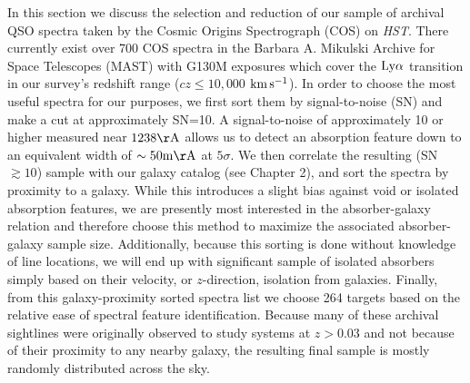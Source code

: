 \documentclass[twocolumn,tighten]{aastex62}
\newcommand{\kms}{$\rm km\, s^{-1}$}
\begin{document}
In this section we discuss the selection and reduction of our sample of archival QSO spectra taken by the Cosmic Origins Spectrograph (COS) on \textit{HST}. There currently exist over 700 COS spectra in the Barbara A. Mikulski Archive for Space Telescopes (MAST) with G130M exposures which cover the $\rm Ly\alpha$ transition in our survey's redshift range ($cz \leq 10,000$ \kms). In order to choose the most useful spectra for our purposes, we first sort them by signal-to-noise (SN) and make a cut at approximately SN=10. A signal-to-noise of approximately 10 or higher measured near $\rm 1238 \AA$ allows us to detect an absorption feature down to an equivalent width of $\rm \sim 50 m\AA$ at $5\sigma$. We then correlate the resulting (SN$\gtrsim 10$) sample with our galaxy catalog (see Chapter 2), and sort the spectra by proximity to a galaxy. While this introduces a slight bias against void or isolated absorption features, we are presently most interested in the absorber-galaxy relation and therefore choose this method to maximize the associated absorber-galaxy sample size. Additionally, because this sorting is done without knowledge of line locations, we will end up with significant sample of isolated absorbers simply based on their velocity, or $z$-direction, isolation from galaxies. Finally, from this galaxy-proximity sorted spectra list we choose 264 targets based on the relative ease of spectral feature identification. Because many of these archival sightlines were originally observed to study systems at $z > 0.03$ and not because of their proximity to any nearby galaxy, the resulting final sample is mostly randomly distributed across the sky.
\end{document}
